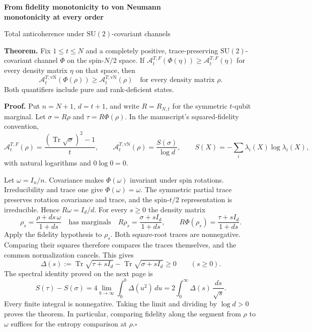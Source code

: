 \documentclass[11pt,a4paper]{article}
\newcommand{\Tr}{\operatorname{Tr}}
\newcommand{\A}{\mathcal A}
\newcommand{\id}{I}
\begin{document}
\begin{center}
{\Large\bfseries From fidelity monotonicity to von Neumann\\[3pt] monotonicity at every order}\par
\smallskip
{\normalsize Total anticoherence under $\mathrm{SU}(2)$-covariant channels}
\end{center}

\textbf{Theorem.} Fix $1\le t\le N$ and a completely positive, trace-preserving
$\mathrm{SU}(2)$-covariant channel $\Phi$ on the spin-$N/2$ space.
If $\A_t^{T,F}(\Phi(\eta))\ge\A_t^{T,F}(\eta)$ for every density matrix $\eta$ on that space, then
\[
           \boxed{\quad \A_t^{T,\mathrm{vN}}(\Phi(\rho))
                     \ge\A_t^{T,\mathrm{vN}}(\rho)
                     \quad\text{for every density matrix }\rho.\quad}
\]
Both quantifiers include pure and rank-deficient states.

\textbf{Proof.} Put $n=N+1$, $d=t+1$, and write $R=R_{N,t}$ for the symmetric $t$-qubit marginal. Let $\sigma=R\rho$ and $\tau=R\Phi(\rho)$. In the manuscript's squared-fidelity convention,
\[
 \A_t^{T,F}(\rho)=\frac{(\Tr\sqrt\sigma)^2-1}{t},\qquad
 \A_t^{T,\mathrm{vN}}(\rho)=\frac{S(\sigma)}{\log d},\qquad
 S(X)=-\sum_i\lambda_i(X)\log\lambda_i(X),
\]
with natural logarithms and $0\log 0=0$.

Let $\omega=\id_n/n$. Covariance makes $\Phi(\omega)$ invariant under spin rotations. Irreducibility and trace one give $\Phi(\omega)=\omega$. The symmetric partial trace preserves rotation covariance and trace, and the spin-$t/2$ representation is irreducible. Hence $R\omega=\id_d/d$. For every $s\ge0$ the density matrix
\[
 \rho_s=\frac{\rho+ds\,\omega}{1+ds}
 \quad\text{has marginals}\quad
 R\rho_s=\frac{\sigma+s\id_d}{1+ds},\qquad
 R\Phi(\rho_s)=\frac{\tau+s\id_d}{1+ds}.
\]
Apply the fidelity hypothesis to $\rho_s$. Both square-root traces are nonnegative. Comparing their squares therefore compares the traces themselves, and the common normalization cancels. This gives
\[
      \Delta(s):=\Tr\sqrt{\tau+s\id_d}-\Tr\sqrt{\sigma+s\id_d}\ge0
      \qquad(s\ge0).
\]
The spectral identity proved on the next page is
\begin{equation}
 S(\tau)-S(\sigma)=4\lim_{b\to\infty}\int_0^b\Delta(u^2)\,du
                 =2\int_0^\infty\Delta(s)\,\frac{ds}{\sqrt{s}} . \label{eq:identity}
\end{equation}
Every finite integral is nonnegative. Taking the limit and dividing by $\log d>0$ proves the theorem. In particular, comparing fidelity along the segment from $\rho$ to $\omega$ suffices for the entropy comparison at $\rho$.\hfill$\square$
\end{document}
